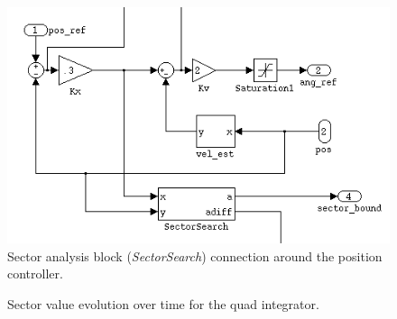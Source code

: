 \begin{figure}[htb]
\centering
\includegraphics[width=0.75\columnwidth]{figures/sectorconn}
    \caption{Sector analysis block (\emph{SectorSearch}) connection around the position controller.}
    \label{fig:sectorconn}
\end{figure}



\begin{figure}[htb]
\centering
{}
{}
\caption{Sector value evolution over time for the quad integrator.}
\label{fig:sectors}
\end{figure}


